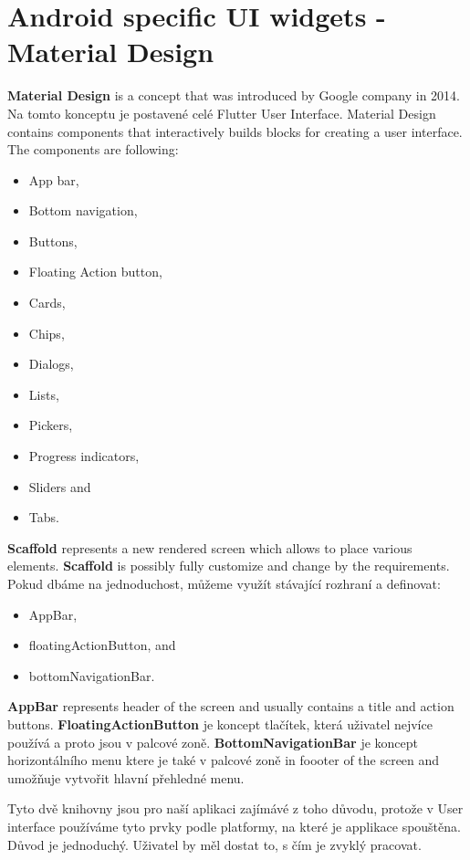\section{Android specific UI widgets - Material Design}\label{sec:android-specific-ui-widgets}
\textbf{Material Design} is a concept that was introduced by Google company in 2014.\cite{materialDesignArticle}
Na tomto konceptu je postavené celé Flutter User Interface.
Material Design contains components that interactively builds blocks for creating a user interface.
The components are following:
\begin{itemize}
    \item App bar,
    \item Bottom navigation,
    \item Buttons,
    \item Floating Action button,
    \item Cards,
    \item Chips,
    \item Dialogs,
    \item Lists,
    \item Pickers,
    \item Progress indicators,
    \item Sliders and
    \item Tabs.\cite{materialDesign}
\end{itemize}

\textbf{Scaffold} represents a new rendered screen which allows to place various elements.
\textbf{Scaffold} is possibly fully customize and change by the requirements.
Pokud dbáme na jednoduchost, můžeme využít stávající rozhraní a definovat:
\begin{itemize}
    \item AppBar,
    \item floatingActionButton, and
    \item bottomNavigationBar.
\end{itemize}
\textbf{AppBar} represents header of the screen and usually contains a title and action buttons.
\textbf{FloatingActionButton} je koncept tlačítek, která uživatel nejvíce používá a proto jsou v palcové zoně.
\textbf{BottomNavigationBar} je koncept horizontálního menu ktere je také v palcové zoně in foooter of the screen and umožňuje vytvořit hlavní přehledné menu.

Tyto dvě knihovny jsou pro naší aplikaci zajímávé z toho důvodu, protože v User interface používáme tyto prvky podle platformy, na které je applikace spouštěna.
Důvod je jednoduchý.
Uživatel by měl dostat to, s čím je zvyklý pracovat.
